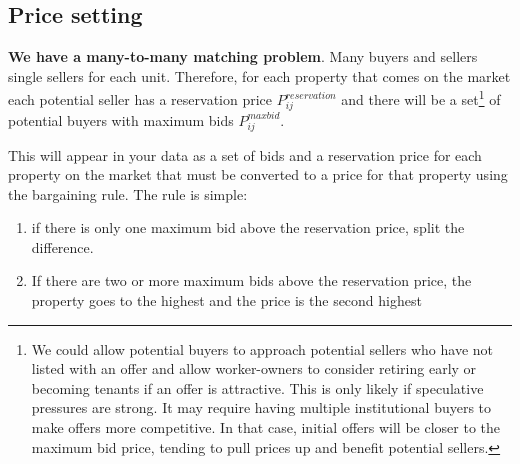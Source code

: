


\subsection{Price setting}
\textbf{We have a many-to-many matching problem}. Many buyers and sellers single sellers for each unit. Therefore, for each property that comes on the market each potential seller has a reservation price $P_{ij}^{reservation}$ and there will be a set\footnote{We could allow potential buyers  to approach potential sellers who have not listed with an offer and allow worker-owners to consider retiring early or becoming tenants if an offer is attractive.  This is only likely if speculative pressures are strong. It may require having multiple institutional buyers to make offers more competitive. In that case, initial offers will be closer to the maximum bid price, tending to pull prices up and benefit potential sellers.}  of potential buyers with maximum bids $P_{ij}^{maxbid}$.


This will appear in your data as a set of bids and a reservation price for each property on the market that must be converted to a price for that property using the bargaining rule. The rule is simple: 
\begin{enumerate}
    \item if there is only one maximum bid above the reservation price, split the difference.

    \item If there are two or more maximum bids above the reservation price, the property goes to the highest  and the price is the second highest
\end{enumerate}

